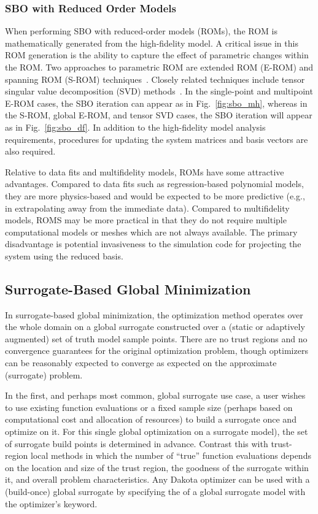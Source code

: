 \subsubsection{SBO with Reduced Order Models}\label{adv_meth:sbm:sblm:rom}

When performing SBO with reduced-order models (ROMs), the ROM is
mathematically generated from the high-fidelity model.  A critical
issue in this ROM generation is the ability to capture the effect of
parametric changes within the ROM.  Two approaches to parametric ROM
are extended ROM (E-ROM) and spanning ROM (S-ROM)
techniques~\cite{Wei06}.  Closely related techniques include tensor
singular value decomposition (SVD) methods~\cite{Lat00}.  In the
single-point and multipoint E-ROM cases, the SBO iteration can appear
as in Fig.~\ref{fig:sbo_mh}, whereas in the S-ROM, global E-ROM, and
tensor SVD cases, the SBO iteration will appear as in
Fig.~\ref{fig:sbo_df}.  In addition to the high-fidelity model
analysis requirements, procedures for updating the system matrices and
basis vectors are also required.

Relative to data fits and multifidelity models, ROMs have some
attractive advantages.  Compared to data fits such as regression-based
polynomial models, they are more physics-based and would be expected
to be more predictive (e.g., in extrapolating away from the immediate
data).  Compared to multifidelity models, ROMS may be more practical
in that they do not require multiple computational models or meshes
which are not always available.  The primary disadvantage is potential
invasiveness to the simulation code for projecting the system using
the reduced basis.


\subsection{Surrogate-Based Global Minimization}\label{adv_meth:sbm:sbgm}

In surrogate-based global minimization, the optimization method
operates over the whole domain on a global surrogate constructed over
a (static or adaptively augmented) set of truth model sample
points. There are no trust regions and no convergence guarantees for
the original optimization problem, though optimizers can be reasonably
expected to converge as expected on the approximate (surrogate)
problem.

In the first, and perhaps most common, global surrogate use case, a
user wishes to use existing function evaluations or a fixed sample
size (perhaps based on computational cost and allocation of resources)
to build a surrogate once and optimize on it.  For this single global
optimization on a surrogate model), the set of surrogate build points
is determined in advance. Contrast this with trust-region local
methods in which the number of ``true'' function evaluations depends
on the location and size of the trust region, the goodness of the
surrogate within it, and overall problem characteristics. Any Dakota
optimizer can be used with a (build-once) global surrogate by
specifying the  of a global surrogate model with
the optimizer's  keyword.

